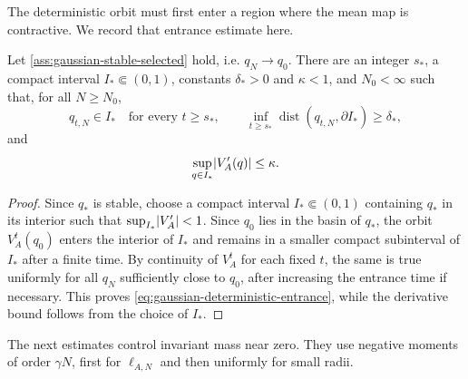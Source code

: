 \documentclass[11pt,reqno,a4paper]{article}
\begin{document}
The deterministic orbit must first enter a region where the mean map is
contractive. We record that entrance estimate here.
\begin{lemma}
\label{lem:gaussian-deterministic-entrance}
  Let \cref{ass:gaussian-stable-selected} hold, i.e. $q_N\to q_0$. There are
  an integer $s_\ast$, a compact interval $I_\ast\Subset(0,1)$, constants
  $\delta_\ast>0$ and $\kappa<1$, and $N_0<\infty$ such that, for all
  $N\geq N_0$,
  \begin{equation}\label{eq:gaussian-deterministic-entrance}
    q_{t,N}\in I_\ast\quad\mbox{for every }t\geq s_\ast,
    \qquad
    \inf_{t\geq s_\ast}
    \operatorname{dist}(q_{t,N},\partial I_\ast)
    \geq
    \delta_\ast,
  \end{equation}
  and
  \begin{equation}\label{eq:gaussian-stable-basin-derivative}
    \sup_{q\in I_\ast}\abs{V_A'(q)}\leq\kappa.
  \end{equation}
\end{lemma}

\begin{proof}
  Since $q_\ast$ is stable, choose a compact interval $I_\ast\Subset(0,1)$
  containing $q_\ast$ in its interior such that
  $\sup_{I_\ast}\abs{V_A'}<1$. Since $q_0$ lies in the basin of $q_\ast$,
  the orbit $V_A^t(q_0)$ enters the interior of $I_\ast$ and
  remains in a smaller compact subinterval of $I_\ast$ after a finite time.
  By continuity of $V_A^t$ for each fixed $t$, the same is true uniformly
  for all $q_N$ sufficiently close to $q_0$, after increasing the entrance time
  if necessary. This proves \cref{eq:gaussian-deterministic-entrance}, while
  the derivative bound follows from the choice of $I_\ast$.
\end{proof}

The next estimates control invariant mass near zero. They use negative
moments of order $\gamma N$, first for $\ell_{A,N}$ and then uniformly for
small radii.
\end{document}
